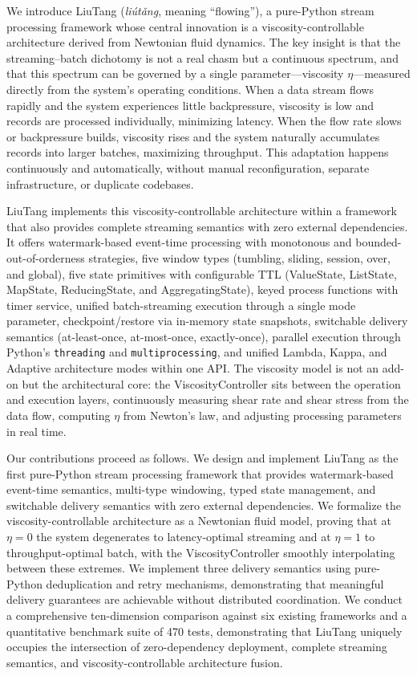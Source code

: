 \documentclass[conference]{IEEEtran}
\begin{document}
We introduce LiuTang (\emph{li\'{u}t\v{a}ng}, meaning ``flowing''), a pure-Python stream processing framework whose central innovation is a viscosity-controllable architecture derived from Newtonian fluid dynamics. The key insight is that the streaming--batch dichotomy is not a real chasm but a continuous spectrum, and that this spectrum can be governed by a single parameter---viscosity $\eta$---measured directly from the system's operating conditions. When a data stream flows rapidly and the system experiences little backpressure, viscosity is low and records are processed individually, minimizing latency. When the flow rate slows or backpressure builds, viscosity rises and the system naturally accumulates records into larger batches, maximizing throughput. This adaptation happens continuously and automatically, without manual reconfiguration, separate infrastructure, or duplicate codebases.

LiuTang implements this viscosity-controllable architecture within a framework that also provides complete streaming semantics with zero external dependencies. It offers watermark-based event-time processing with monotonous and bounded-out-of-orderness strategies, five window types (tumbling, sliding, session, over, and global), five state primitives with configurable TTL (ValueState, ListState, MapState, ReducingState, and AggregatingState), keyed process functions with timer service, unified batch-streaming execution through a single mode parameter, checkpoint/restore via in-memory state snapshots, switchable delivery semantics (at-least-once, at-most-once, exactly-once), parallel execution through Python's \texttt{threading} and \texttt{multiprocessing}, and unified Lambda, Kappa, and Adaptive architecture modes within one API. The viscosity model is not an add-on but the architectural core: the ViscosityController sits between the operation and execution layers, continuously measuring shear rate and shear stress from the data flow, computing $\eta$ from Newton's law, and adjusting processing parameters in real time.

Our contributions proceed as follows. We design and implement LiuTang as the first pure-Python stream processing framework that provides watermark-based event-time semantics, multi-type windowing, typed state management, and switchable delivery semantics with zero external dependencies. We formalize the viscosity-controllable architecture as a Newtonian fluid model, proving that at $\eta = 0$ the system degenerates to latency-optimal streaming and at $\eta = 1$ to throughput-optimal batch, with the ViscosityController smoothly interpolating between these extremes. We implement three delivery semantics using pure-Python deduplication and retry mechanisms, demonstrating that meaningful delivery guarantees are achievable without distributed coordination. We conduct a comprehensive ten-dimension comparison against six existing frameworks and a quantitative benchmark suite of 470 tests, demonstrating that LiuTang uniquely occupies the intersection of zero-dependency deployment, complete streaming semantics, and viscosity-controllable architecture fusion.
\end{document}
